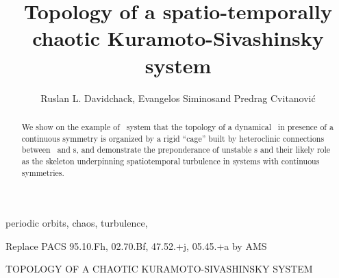 \documentclass{siamltex}
\begin{document}
                \title{
Topology of a spatio-temporally chaotic Kuramoto-Sivashinsky system
                 }
                  \author{
Ruslan L. Davidchack\footnotemark[1],
Evangelos Siminos\footnotemark[2]
    and
Predrag Cvitanovi\'c\footnotemark[2]
                    }
                  

                \maketitle

\renewcommand{\thefootnote}{\fnsymbol{footnote}}
\renewcommand{\thefootnote}{\arabic{footnote}}
  
                \begin{abstract}
We show on the example of \KS\ system
that the topology of a dynamical \statesp\ in presence of 
a continuous symmetry is organized by 
a rigid ``cage'' built by heteroclinic connections
between \eqva\ and \rpo s, and demonstrate the
preponderance of unstable \rpo s and their likely
role as the skeleton underpinning spatiotemporal turbulence in
systems with continuous symmetries.  
                \end{abstract}

\begin{keywords}
periodic orbits, chaos, turbulence, {\KSe}
\end{keywords}

\begin{AMS}
    Replace PACS 95.10.Fh, 02.70.Bf, 47.52.+j, 05.45.+a by AMS
\end{AMS}

\pagestyle{myheadings}
\thispagestyle{plain}
         {TOPOLOGY OF A CHAOTIC KURAMOTO-SIVASHINSKY SYSTEM}









    \PublicPrivate{%
        }{%

\appendix

\newpage
    } %
\end{document}
